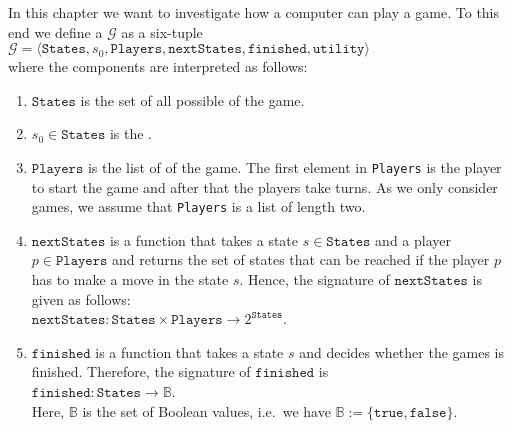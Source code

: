 In this chapter we want to investigate how a computer can play a game.  To this end we define a
 $\mathcal{G}$ as a six-tuple
\\[0.2cm]
\hspace*{1.3cm}
$\mathcal{G} = \langle \texttt{States}, s_0, \texttt{Players}, \texttt{nextStates}, \texttt{finished},\texttt{utility} \rangle$
\\[0.2cm]
where the components are interpreted as follows:
\begin{enumerate}
\item $\texttt{States}$ is the set of all possible  of the game.
\item $s_0 \in \texttt{States}$ is the .
\item $\texttt{Players}$ is  the list of  of the game.  The first element in \texttt{Players} is
      the player to start the game and after that the players take turns.  As we only consider 
      games, we assume that \texttt{Players} is a list of length two.
\item $\texttt{nextStates}$ is a function that takes a state $s \in \texttt{States}$ and a player $p \in \texttt{Players}$ and returns the set of
      states that can be reached if the player $p$ has to make a move in the state $s$.  Hence, the signature of
      $\texttt{nextStates}$ is given as follows:
      \\[0.2cm]
      \hspace*{1.3cm}
      $\texttt{nextStates}: \texttt{States} \times \texttt{Players} \rightarrow 2^{\texttt{States}}$.
\item $\texttt{finished}$ is a function that takes a state $s$ and decides whether the games is finished.
      Therefore, the signature of $\texttt{finished}$ is
      \\[0.2cm]
      \hspace*{1.3cm}
      $\texttt{finished}: \texttt{States} \rightarrow \mathbb{B}$.
      \\[0.2cm]
      Here, $\mathbb{B}$ is the set of Boolean values, i.e.~we have $\mathbb{B} := \{ \texttt{true}, \texttt{false} \}$.
  

\end{enumerate}
